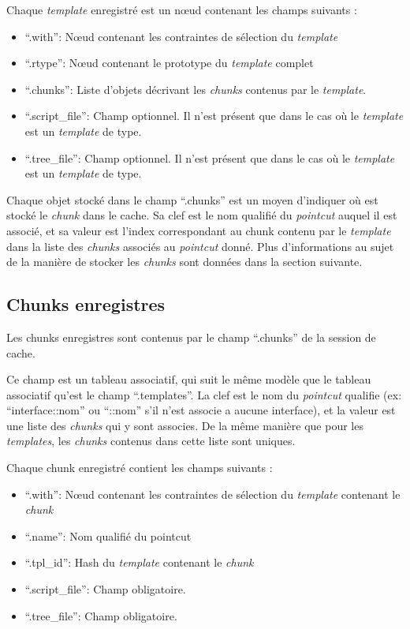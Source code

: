 \documentclass[french]{rtxreport}
\begin{document}
Chaque \emph{template} enregistré est un nœud contenant les champs suivants :
\begin{itemize}
    \item ``.with'': Nœud contenant les contraintes de sélection du
        \emph{template}
    \item ``.rtype'': Nœud contenant le prototype du \emph{template} complet
    \item ``.chunks'': Liste d'objets décrivant les \emph{chunks} contenus par
        le \emph{template}.
    \item ``.script\_file'': Champ optionnel. Il n'est présent que dans le cas
        où le \emph{template} est un \emph{template} de type.
    \item ``.tree\_file'': Champ optionnel. Il n'est présent que dans le cas
        où le \emph{template} est un \emph{template} de type.
\end{itemize}

Chaque objet stocké dans le champ ``.chunks'' est un moyen d'indiquer où est
stocké le \emph{chunk} dans le cache. Sa clef est le nom qualifié du
\emph{pointcut} auquel il est associé, et sa valeur est l'index correspondant
au chunk contenu par le \emph{template} dans la liste des \emph{chunks}
associés au \emph{pointcut} donné. Plus d'informations au sujet de la manière
de stocker les \emph{chunks} sont données dans la section suivante.


\subsection{Chunks enregistres}

Les chunks enregistres sont contenus par le champ ``.chunks'' de la session de
cache.

Ce champ est un tableau associatif, qui suit le même modèle que le tableau
associatif qu'est le champ ``.templates''. La clef est le nom du
\emph{pointcut} qualifie (ex: ``interface::nom'' ou ``::nom'' s'il n'est
associe a aucune interface), et la valeur est une liste des \emph{chunks} qui y
sont associes. De la même manière que pour les \emph{templates}, les
\emph{chunks} contenus dans cette liste sont uniques.

Chaque chunk enregistré contient les champs suivants :
\begin{itemize}
    \item ``.with'': Nœud contenant les contraintes de sélection du
        \emph{template} contenant le \emph{chunk}
    \item ``.name'': Nom qualifié du pointcut
    \item ``.tpl\_id'': Hash du \emph{template} contenant le \emph{chunk}
    \item ``.script\_file'': Champ obligatoire.
    \item ``.tree\_file'': Champ obligatoire.
\end{itemize}
\end{document}
